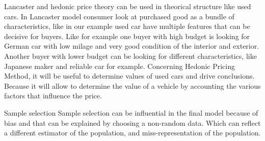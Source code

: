 \documentclass[12pt]{book}
\begin{document}
Lancaster and hedonic price theory can be used in theorical structure like used cars.
\vskip 12pt
In Lancaster model consumer look at purchased good as a bundle of characteristics, like in our example used car have multiple features that can be decisive for buyers. Like for example one buyer with high budget is looking for German car with low milage and very good condition of the interior and exterior. Another buyer with lower budget can be looking for different characteristics, like Japanese maker and reliable car for example. 
\vskip 12pt
Concerning Hedonic Pricing Method, it will be useful to determine values of used cars and drive conclusions. Because it will allow to determine the value of a vehicle by accounting the various factors that influence the price. 







Sample selection 
\vskip 12pt
Sample selection can be influential in the final model because of bias and that can be explained by choosing a non-random data. Which can reflect a different estimator of the population, and miss-representation of the population.
\end{document}
